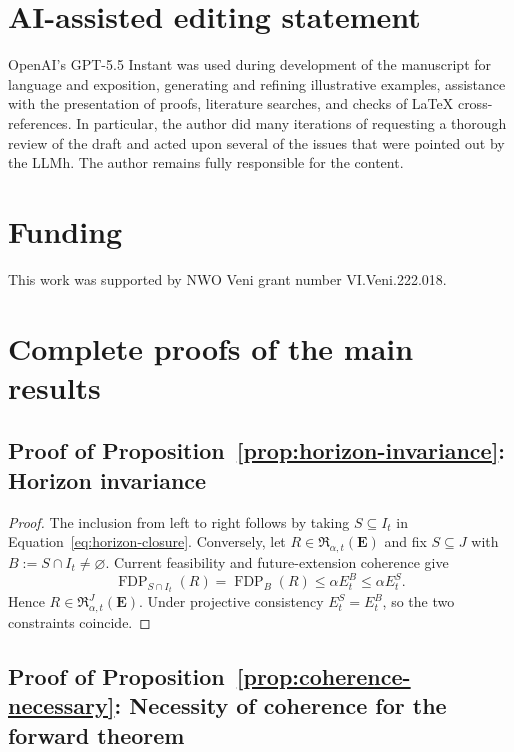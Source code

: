 \documentclass[11pt]{article}
\numberwithin{equation}{section}
\theoremstyle{plain}
\theoremstyle{definition}
\newcommand{\Rfam}{\mathfrak R}
\newcommand{\FDP}{\operatorname{FDP}}
\begin{document}
\section*{AI-assisted editing statement}
OpenAI's GPT-5.5 Instant  was used during development of the manuscript for language and exposition, generating and refining illustrative examples, assistance with the presentation of proofs, literature searches, and checks of LaTeX cross-references. In particular, the author did many iterations of requesting a thorough review of the draft and acted upon several of the issues that were pointed out by the LLMh. The author remains fully responsible for the content.

\section*{Funding}
This work was supported by NWO Veni grant number VI.Veni.222.018.

\clearpage
{}
{}



\clearpage
\appendix

\section{Complete proofs of the main results}\label{app:proofs}

\subsection{Proof of Proposition~\ref{prop:horizon-invariance}: Horizon invariance}\label{app:proof-horizon}

\begin{proof}
The inclusion from left to right follows by taking $S\subseteq I_t$ in Equation~\eqref{eq:horizon-closure}. Conversely, let $R\in\Rfam_{\alpha,t}(\mathbf E)$ and fix $S\subseteq J$ with $B:=S\cap I_t\neq\varnothing$. Current feasibility and future-extension coherence give
\[
  \FDP_{S\cap I_t}(R)=\FDP_B(R)
  \leq\alpha E_t^B\leq\alpha E_t^S.
\]
Hence $R\in\Rfam_{\alpha,t}^{J}(\mathbf E)$. Under projective consistency $E_t^S=E_t^B$, so the two constraints coincide.
\end{proof}

\subsection{Proof of Proposition~\ref{prop:coherence-necessary}: Necessity of coherence for the forward theorem}\label{app:proof-coherence-necessary}
\end{document}
